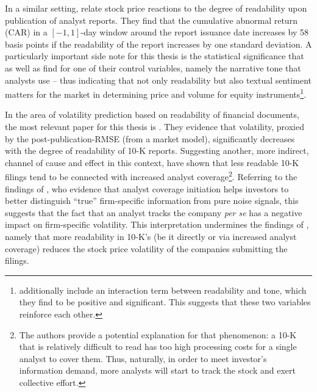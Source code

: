 
In a similar setting, \textcite{HsiehHuiZhang2016} relate stock price reactions to the degree of readability upon publication of analyst reports. They find that the cumulative abnormal return (CAR) in a $[-1,1]$-day window around the report issuance date increases by 58 basis points if the readability of the report increases by one standard deviation. A particularly important side note for this thesis is the statistical significance that \textcite{HsiehHuiZhang2016} as well as \textcite{DeFranco2015} find for one of their control variables, namely the narrative tone that analysts use -- thus indicating that not only readability but also textual sentiment matters for the market in determining price and volume for equity instruments\footnote{\textcite{DeFranco2015} additionally include an interaction term between readability and tone, which they find to be positive and significant. This suggests that these two variables reinforce each other.}.



In the area of volatility prediction based on readability of financial documents, the most relevant paper for this thesis is \textcite{Loughran2014}. They evidence that volatility, proxied by the post-publication-RMSE (from a market model), significantly decreases with the degree of readability of 10-K reports. Suggesting another, more indirect, channel of cause and effect in this context, \textcite{LehavyLiMerkley2011} have shown that less readable 10-K filings tend to be connected with increased analyst coverage\footnote{The authors provide a potential explanation for that phenomenon: a 10-K that is relatively difficult to read has too high processing costs for a single analyst to cover them. Thus, naturally, in order to meet investor's information demand, more analysts will start to track the stock and exert collective effort.}. Referring to the findings of \textcite{Schutte2007}, who evidence that analyst coverage initiation helps investors to better distinguish \enquote{true} firm-specific information from pure noise signals, this suggests that the fact that an analyst tracks the company \textit{per se} has a negative impact on firm-specific volatility. This interpretation undermines the findings of \textcite{Loughran2014}, namely that more readability in 10-K's (be it directly or via increased analyst coverage) reduces the stock price volatility of the companies submitting the filings.

